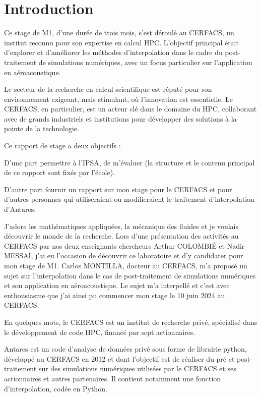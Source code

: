 \section*{Introduction}

Ce stage de M1, d'une durée de trois mois, s'est déroulé au CERFACS, un institut reconnu pour son expertise en calcul \ac{HPC}. L'objectif principal était d'explorer et d'améliorer les méthodes d'interpolation dans le cadre du post-traitement de simulations numériques, avec un focus particulier sur l'application en aéroacoustique.

Le secteur de la recherche en calcul scientifique est réputé pour son environnement exigeant, mais stimulant, où l'innovation est essentielle. Le CERFACS, en particulier, est un acteur clé dans le domaine du HPC, collaborant avec de grands industriels et institutions pour développer des solutions à la pointe de la technologie.

Ce rapport de stage a deux objectifs :

D'une part permettre à l'IPSA, de m'évaluer (la structure et le contenu principal de ce rapport sont fixés par l'école).

D'autre part fournir un rapport sur mon stage pour le CERFACS et pour d'autres personnes qui utiliseraient ou modifieraient le traitement d'interpolation d'Antares.

\vspace{0.5cm}

J'adore les mathématiques appliquées, la mécanique des fluides et je voulais découvrir le monde de la recherche. Lors d'une présentation des activités au \ac{CERFACS} par nos deux enseignants chercheurs Arthur COLOMBIÉ et Nadir MESSAI, j'ai eu l'occasion de découvrir ce laboratoire et d'y candidater pour mon stage de M1. Carlos MONTILLA, docteur au CERFACS, m'a proposé un sujet sur l'interpolation dans le cas de post-traitement de simulations numériques et son application en aéroacoustique. Le sujet m'a interpellé et c'est avec enthousiasme que j'ai ainsi pu commencer mon stage le 10 juin 2024 au CERFACS.

En quelques mots, le CERFACS est un institut de recherche privé, spécialisé dans le développement de code HPC, financé par sept actionnaires.

Antares\cite{antares} est un code d’analyse de données privé sous forme de librairie python, développé au CERFACS en 2012 et dont l'objectif est de réaliser du pré et post-traitement sur des simulations numériques utilisées par le CERFACS et ses actionnaires et autres partenaires.
Il contient notamment une fonction d'interpolation, codée en Python.


